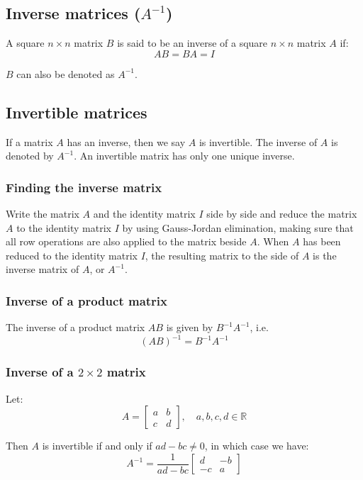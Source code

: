 \documentclass[11pt]{article}
\begin{document}
\subsection{Inverse matrices (\(A^{-1}\))}
\label{sec:org684d664}
A square \(n \times n\) matrix \(B\) is said to be an inverse of a square \(n \times n\) matrix \(A\) if:
\[AB = BA = I\]

\(B\) can also be denoted as \(A^{-1}\).
\subsection{Invertible matrices}
\label{sec:orgbb20cdf}
If a matrix \(A\) has an inverse, then we say \(A\) is invertible. The inverse of \(A\) is denoted by \(A^{-1}\). An invertible matrix has only one unique inverse.
\subsubsection{Finding the inverse matrix}
\label{sec:orgb123163}
Write the matrix \(A\) and the identity matrix \(I\) side by side and reduce the matrix \(A\) to the identity matrix \(I\) by using Gauss-Jordan elimination, making sure that all row operations are also applied to the matrix beside \(A\). When \(A\) has been reduced to the identity matrix \(I\), the resulting matrix to the side of \(A\) is the inverse matrix of \(A\), or \(A^{-1}\).
\subsubsection{Inverse of a product matrix}
\label{sec:org6b2d790}
The inverse of a product matrix \(AB\) is given by \(B^{-1} A^{-1}\), i.e.
\[(AB)^{-1} = B^{-1} A^{-1}\]
\subsubsection{Inverse of a \(2 \times 2\) matrix}
\label{sec:org7f6f204}
Let:
\begin{displaymath}
A = \begin{bmatrix}
a & b \\
c & d
\end{bmatrix}, \quad a, b, c, d \in \mathbb{R}
\end{displaymath}

Then \(A\) is invertible if and only if \(ad - bc \neq 0\), in which case we have:
\begin{displaymath}
A^{-1} = \frac{1}{ad - bc} \begin{bmatrix}
d & -b \\
-c & a
\end{bmatrix}
\end{displaymath}
\end{document}
